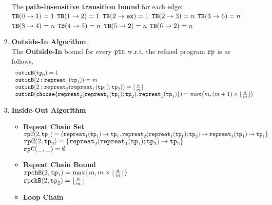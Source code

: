 \begin{enumerate}
    \\
    The \textbf{path-insensitive transition bound} for each edge:
    \\  
      ${\mathtt{TB}}(0 \to 1) = 1$
      \quad ${\mathtt{TB}}(1 \to 2) = 1$
      \quad ${\mathtt{TB}}(2 \to \mathtt{ex}) = 1$ 
      \quad ${\mathtt{TB}}(2 \to 3) = n$ 
      \quad ${\mathtt{TB}}(3 \to 6) = n$ 
      \\
      \quad ${\mathtt{TB}}(3 \to 4) = n$ 
      \quad ${\mathtt{TB}}(4 \to 5) = n$ 
      \quad ${\mathtt{TB}}(5 \to 2) = n$ 
      \quad ${\mathtt{TB}}(6 \to 2) = n$ 
  \item \textbf{Outside-In Algorithm}:\\
  The \textbf{Outside-In} bound for every $\mathtt{ptn}$ w.r.t. the refined program $\mathtt{rp}$ is as follows,
  \[
    \begin{array}{l}
        \outinB(\tpath_0) = 1
        \\
        \outinB(2: \rprepeat_1(\tpath_1)) = m 
        \\
        \outinB(2: \rprepeat_2(\rprepeat_1(\tpath_1); \tpath_2)) = \lfloor\frac{n}{m}\rfloor
        \\
        \outinB(\rpchoose{\rprepeat_2(\rprepeat_1(\tpath_1); \tpath_2), \rprepeat_1(\tpath_1) })
        = \max\{m, (m  + 1)\times \lfloor\frac{n}{m}\rfloor\}
\end{array}
\]
\item \textbf{Inside-Out Algorithm}
\begin{itemize}
  \item \textbf{Repeat Chain Set}
  \\
  $\mathtt{rp}\mathcal{C}(2, \mathtt{tp}_1) = \{\mathtt{repreat}_1(\mathtt{tp}_1) \to \mathtt{tp}_1, \mathtt{repreat}_2(\mathtt{repreat}_1(\mathtt{tp}_1); \mathtt{tp}_2) \to \mathtt{repreat}_1(\mathtt{tp}_1) \to \mathtt{tp}_1\}$ \\
  $\mathtt{rp}\mathcal{C}(2, \mathtt{tp}_2) = \{\mathtt{repreat}_2(\mathtt{repreat}_1(\mathtt{tp}_1); \mathtt{tp}_2) \to  \mathtt{tp}_2\}$ \\
  $\mathtt{rp}\mathcal{C}(\_, \_) = \emptyset$ 
  \item \textbf{Repeat Chain Bound}
  \\
  $\mathtt{rpchB}(2, \mathtt{tp}_1) = \max\{m, m \times \lfloor\frac{n}{m}\rfloor\}$ \\
  $\mathtt{rpchB}(2, \mathtt{tp}_2) = \lfloor\frac{n}{m}\rfloor$ 
  \item \textbf{Loop Chain}
  \\

\end{itemize}
\end{enumerate}
